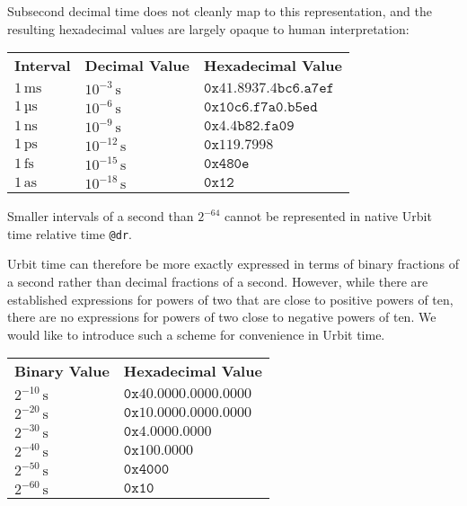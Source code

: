 \documentclass[twoside]{article}
\begin{document}
Subsecond decimal time does not cleanly map to this representation, and the resulting hexadecimal values are largely opaque to human interpretation:

\begin{tabularx}{\textwidth}{lll}
  \textbf{Interval} & \textbf{Decimal Value} & \textbf{Hexadecimal Value} \\
  $1 \,\textrm{ms}$ & $10^{-3} \,\textrm{s}$ & $\mathtt{0x41.8937.4bc6.a7ef}$ \\
  $1 \,\textrm{µs}$ & $10^{-6} \,\textrm{s}$ & $\mathtt{0x10c6.f7a0.b5ed}$ \\
  $1 \,\textrm{ns}$ & $10^{-9} \,\textrm{s}$ & $\mathtt{0x4.4b82.fa09}$ \\
  $1 \,\textrm{ps}$ & $10^{-12} \,\textrm{s}$ & $\mathtt{0x119.7998}$ \\
  $1 \,\textrm{fs}$ & $10^{-15} \,\textrm{s}$ & $\mathtt{0x480e}$ \\
  $1 \,\textrm{as}$ & $10^{-18} \,\textrm{s}$ & $\mathtt{0x12}$ \\
\end{tabularx}

\noindent
Smaller intervals of a second than $2^{-64}$ cannot be represented in native Urbit time relative time \lstinline[style=inlinecode]{@dr}.

Urbit time can therefore be more exactly expressed in terms of binary fractions of a second rather than decimal fractions of a second.  However, while there are established expressions for powers of two that are close to positive powers of ten, there are no expressions for powers of two close to negative powers of ten.  We would like to introduce such a scheme for convenience in Urbit time.

\begin{tabularx}{\textwidth}{ll}
  \textbf{Binary Value} & \textbf{Hexadecimal Value} \\
  $2^{-10} \,\textrm{s}$ & $\mathtt{0x40.0000.0000.0000}$ \\
  $2^{-20} \,\textrm{s}$ & $\mathtt{0x10.0000.0000.0000}$ \\
  $2^{-30} \,\textrm{s}$ & $\mathtt{0x4.0000.0000}$ \\
  $2^{-40} \,\textrm{s}$ & $\mathtt{0x100.0000}$ \\
  $2^{-50} \,\textrm{s}$ & $\mathtt{0x4000}$ \\
  $2^{-60} \,\textrm{s}$ & $\mathtt{0x10}$ \\
\end{tabularx}
\end{document}
